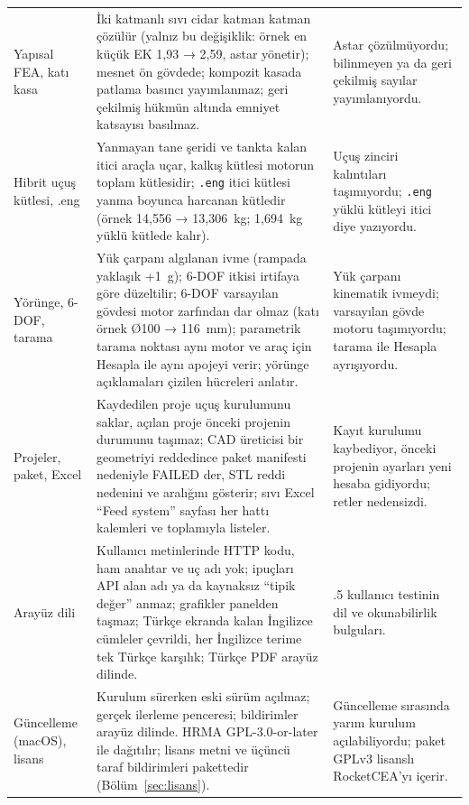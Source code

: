 \documentclass[11pt,a4paper]{article}
\newcommand{\kod}[1]{\texttt{#1}}
\begin{document}
\begin{longtable}{@{}>{\raggedright\arraybackslash}p{3.0cm}>{\raggedright\arraybackslash}p{8.0cm}>{\raggedright\arraybackslash}p{4.6cm}@{}}
Yapısal FEA, katı kasa & İki katmanlı sıvı cidar katman katman çözülür (yalnız bu değişiklik: örnek en küçük EK 1,93 → 2,59, astar yönetir); mesnet ön gövdede; kompozit kasada patlama basıncı yayımlanmaz; geri çekilmiş hükmün altında emniyet katsayısı basılmaz. & Astar çözülmüyordu; bilinmeyen ya da geri çekilmiş sayılar yayımlanıyordu. \\
Hibrit uçuş kütlesi, .eng & Yanmayan tane şeridi ve tankta kalan itici araçla uçar, kalkış kütlesi motorun toplam kütlesidir; \kod{.eng} itici kütlesi yanma boyunca harcanan kütledir (örnek 14,556 → 13,306~kg; 1,694~kg yüklü kütlede kalır). & Uçuş zinciri kalıntıları taşımıyordu; \kod{.eng} yüklü kütleyi itici diye yazıyordu. \\
Yörünge, 6-DOF, tarama & Yük çarpanı algılanan ivme (rampada yaklaşık +1~g); 6-DOF itkisi irtifaya göre düzeltilir; 6-DOF varsayılan gövdesi motor zarfından dar olmaz (katı örnek Ø100 → 116~mm); parametrik tarama noktası aynı motor ve araç için Hesapla ile aynı apojeyi verir; yörünge açıklamaları çizilen hücreleri anlatır. & Yük çarpanı kinematik ivmeydi; varsayılan gövde motoru taşımıyordu; tarama ile Hesapla ayrışıyordu. \\
Projeler, paket, Excel & Kaydedilen proje uçuş kurulumunu saklar, açılan proje önceki projenin durumunu taşımaz; CAD üreticisi bir geometriyi reddedince paket manifesti nedeniyle FAILED der, STL reddi nedenini ve aralığını gösterir; sıvı Excel ``Feed system'' sayfası her hattı kalemleri ve toplamıyla listeler. & Kayıt kurulumu kaybediyor, önceki projenin ayarları yeni hesaba gidiyordu; retler nedensizdi. \\
Arayüz dili & Kullanıcı metinlerinde HTTP kodu, ham anahtar ve uç adı yok; ipuçları API alan adı ya da kaynaksız ``tipik değer'' anmaz; grafikler panelden taşmaz; Türkçe ekranda kalan İngilizce cümleler çevrildi, her İngilizce terime tek Türkçe karşılık; Türkçe PDF arayüz dilinde. & 3.0.5 kullanıcı testinin dil ve okunabilirlik bulguları. \\
Güncelleme (macOS), lisans & Kurulum sürerken eski sürüm açılmaz; gerçek ilerleme penceresi; bildirimler arayüz dilinde. HRMA GPL-3.0-or-later ile dağıtılır; lisans metni ve üçüncü taraf bildirimleri pakettedir (Bölüm~\ref{sec:lisans}). & Güncelleme sırasında yarım kurulum açılabiliyordu; paket GPLv3 lisanslı RocketCEA'yı içerir. \\
\end{longtable}

\end{document}
